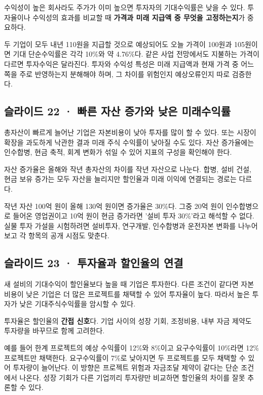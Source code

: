 \documentclass[11pt,a4paper]{article}
\begin{document}
수익성이 높은 회사라도 주가가 이미 높으면 투자자의 기대수익률은 낮을 수 있다. 투자율이나 수익성의 효과를 비교할 때 \textbf{가격과 미래 지급액 중 무엇을 고정하는지}가 중요하다.\par

두 기업이 모두 내년 110원을 지급할 것으로 예상되어도 오늘 가격이 100원과 105원이면 기대 단순수익률은 각각 10\%와 약 4.76\%다. 같은 사업 전망에서도 지불하는 가격이 다르면 투자수익은 달라진다. 투자와 수익성 특성은 미래 지급액과 현재 가격 중 어느 쪽을 주로 반영하는지 분해해야 하며, 그 차이를 위험인지 예상오류인지 따로 검증한다.\par

\subsection{슬라이드 22 · 빠른 자산 증가와 낮은 미래수익률}
총자산이 빠르게 늘어난 기업은 자본비용이 낮아 투자를 많이 할 수 있다. 또는 시장이 확장을 과도하게 낙관한 결과 미래 주식 수익률이 낮아질 수도 있다. 자산 증가율에는 인수합병, 현금 축적, 회계 변화가 섞일 수 있어 지표의 구성을 확인해야 한다.\par

자산 증가율은 올해와 작년 총자산의 차이를 작년 자산으로 나눈다. 합병, 설비 건설, 현금 보유 증가는 모두 자산을 늘리지만 할인율과 미래 이익에 연결되는 경로는 다르다.\par

작년 자산 100억 원이 올해 130억 원이면 증가율은 30\%다. 그중 20억 원이 인수합병으로 들어온 영업권이고 10억 원이 현금 증가라면 '설비 투자 30\%'라고 해석할 수 없다. 실물 투자 가설을 시험하려면 설비투자, 연구개발, 인수합병과 운전자본 변화를 나누어 보고 각 항목의 공개 시점도 맞춘다.\par

\subsection{슬라이드 23 · 투자율과 할인율의 연결}
새 설비의 기대수익이 할인율보다 높을 때 기업은 투자한다. 다른 조건이 같다면 자본비용이 낮은 기업은 더 많은 프로젝트를 채택할 수 있어 투자율이 높다. 따라서 높은 투자가 낮은 기대주식수익률을 암시할 수 있다.\par

투자율은 할인율의 \textbf{간접 신호}다. 기업 사이의 성장 기회, 조정비용, 내부 자금 제약도 투자량을 바꾸므로 함께 고려한다.\par

예를 들어 한계 프로젝트의 예상 수익률이 12\%와 8\%이고 요구수익률이 10\%라면 12\% 프로젝트만 채택한다. 요구수익률이 7\%로 낮아지면 두 프로젝트를 모두 채택할 수 있어 투자량이 늘어난다. 이 방향은 프로젝트 위험과 자금조달 제약이 같다는 단순 조건에서 나온다. 성장 기회가 다른 기업끼리 투자량만 비교하면 할인율의 차이를 잘못 추론할 수 있다.\par
\end{document}
